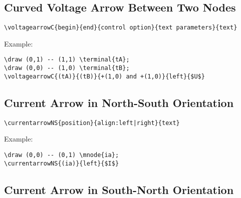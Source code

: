 \documentclass[parskip=full]{scrartcl}
\begin{document}
\subsection{Curved Voltage Arrow Between Two Nodes}

\begin{verbatim}
\voltagearrowC{begin}{end}{control option}{text parameters}{text}
\end{verbatim}

Example:\\
\begin{minipage}{0.8\textwidth}
\begin{verbatim}
\draw (0,1) -- (1,1) \terminal{tA};
\draw (0,0) -- (1,0) \terminal{tB};
\voltagearrowC{(tA)}{(tB)}{+(1,0) and +(1,0)}{left}{$U$}
\end{verbatim}
\end{minipage}
\begin{minipage}{0.19\textwidth}
\end{minipage}

\subsection{Current Arrow in North-South Orientation}

\begin{verbatim}
\currentarrowNS{position}{align:left|right}{text}
\end{verbatim}

Example:\\
\begin{minipage}{0.8\textwidth}
\begin{verbatim}
\draw (0,0) -- (0,1) \mnode{ia};
\currentarrowNS{(ia)}{left}{$I$}
\end{verbatim}
\end{minipage}
\begin{minipage}{0.19\textwidth}
\end{minipage}

\subsection{Current Arrow in South-North Orientation}
\end{document}
